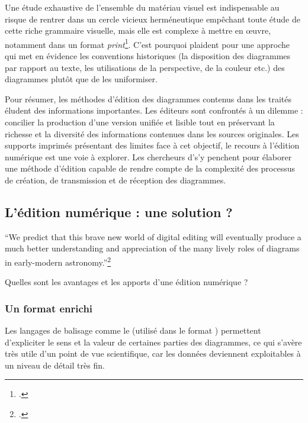 Une étude exhaustive de l'ensemble du matériau visuel est indispensable
au risque de rentrer dans un cercle vicieux herméneutique empêchant
toute étude de cette riche grammaire visuelle, mais elle est complexe à
mettre en œuvre, notamment dans un format \textit{print}\footcite[p.398]{jardine_critical_2010}.
C'est pourquoi \citeauthor{jardine_critical_2010} plaident pour une approche qui met en
évidence les conventions historiques (la disposition des diagrammes par
rapport au texte, les utilisations de la perspective, de la couleur
etc.) des diagrammes plutôt que de les uniformiser.

Pour résumer, les méthodes d'édition des diagrammes contenus dans les
traités éludent des informations importantes. Les éditeurs sont
confrontés à un dilemme : concilier la production d'une version unifiée
et lisible tout en préservant la richesse et la diversité des
informations contenues dans les sources originales. Les supports
imprimés présentant des limites face à cet objectif, le recours à
l'édition numérique est une voie à explorer. Les chercheurs d'\eida s'y
penchent pour élaborer une méthode d'édition capable de rendre compte de
la complexité des processus de création, de transmission et de réception
des diagrammes.

\hypertarget{edition-numeriue-solution}{%
\subsection{L'édition numérique : une solution
?}\label{edition-numeriue-solution}}

\begin{kwote}
``We predict that this brave new world of digital editing will
eventually produce a much better understanding and appreciation of the
many lively roles of diagrams in early-modern astronomy.''\footcite[p.411]{jardine_critical_2010}
\end{kwote}

Quelles sont les avantages et les apports d'une édition numérique ?

\hypertarget{un-format-enrichi}{%
\subsubsection{Un format enrichi}\label{un-format-enrichi}}

Les langages de balisage comme le \xml (utilisé dans le format \svg) permettent d'expliciter le sens et la valeur de certaines parties des diagrammes, ce qui s'avère très utile d'un point de vue scientifique, car les données deviennent exploitables à un niveau de détail très fin. 

